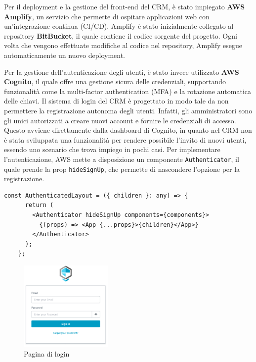 \documentclass[target=bach,aauheader=,style=]{thud}
\begin{document}
\noindent Per il deployment e la gestione del front-end del CRM, è stato impiegato \textbf{AWS Amplify}, un servizio che permette di ospitare applicazioni web con un'integrazione continua (CI/CD). Amplify è stato inizialmente collegato al repository \textbf{BitBucket}, il quale contiene il codice sorgente del progetto. Ogni volta che vengono effettuate modifiche al codice nel repository, Amplify esegue automaticamente un nuovo deployment.

\noindent Per la gestione dell'autenticazione degli utenti, è stato invece utilizzato \textbf{AWS Cognito}, il quale offre una gestione sicura delle credenziali, supportando funzionalità come la multi-factor authentication (MFA) e la rotazione automatica delle chiavi. Il sistema di login del CRM è progettato in modo tale da non permettere la registrazione autonoma degli utenti. Infatti, gli amministratori sono gli unici autorizzati a creare nuovi account e fornire le credenziali di accesso. Questo avviene direttamente dalla dashboard di Cognito, in quanto nel CRM non è stata sviluppata una funzionalità per rendere possibile l'invito di nuovi utenti, essendo uno scenario che trova impiego in pochi casi. Per implementare l'autenticazione, AWS mette a disposizione un componente \texttt{Authenticator}, il quale prende la prop \texttt{hideSignUp}, che permette di nascondere l'opzione per la registrazione.

\begin{lstlisting}[caption=Parte del file \texttt{AuthenticatedLayout.tsx} del CRM]
    const AuthenticatedLayout = ({ children }: any) => {
      return (
        <Authenticator hideSignUp components={components}>
          {(props) => <App {...props}>{children}</App>}
        </Authenticator>
      );
    };
\end{lstlisting}

\begin{figure}[H]
    \centering
    \includegraphics[width=0.4\textwidth]{img/login.pdf} 
    \caption{Pagina di login}
\end{figure}
\end{document}
